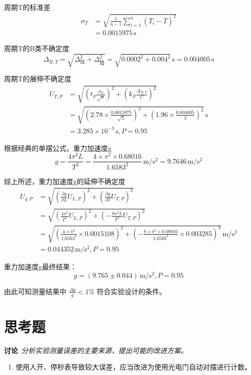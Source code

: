\documentclass[UTF8]{article}
\newcommand{\sector}[2]{\section*{#1}%
\vspace*{-0.8em}\large{#2}%
\vspace*{-0.3em}
}
\begin{document}
{周期T的标准差
$$
\begin{aligned}
\sigma_{T}&=\sqrt{\frac{1}{n-1}\sum_{i=1}^n\left(T_i-\overline{T}\right)^2}\\
&=0.0015975\,\mathrm{s}
\end{aligned}
$$

周期T的B类不确定度
$$
\Delta_{B,T}=\sqrt{\Delta_\text{仪}^2+\Delta_\text{估}^2}=\sqrt{0.0002^2+0.004^2}\,\mathrm{s}=0.004005\,\mathrm{s}
$$

周期T的展伸不确定度
$$
\begin{aligned}
U_{T,P}&=\sqrt{\left(t_P\frac{\sigma_{T}}{\sqrt{n}}\right)^2+\left(k_P\frac{\Delta_{B,T}}{C}\right)^2}\\
&=\sqrt{\left(2.78\times\frac{0.0015975}{\sqrt{5}}\right)^2+\left(1.96\times\frac{0.004005}{3}\right)^2}\,\mathrm{s}\\
&=3.285 \times 10^{-3}\,\mathrm{s},P=0.95
\end{aligned}
$$

根据经典的单摆公式，重力加速度g
$$
g=\frac{4 \pi^{2} L}{T^{2}}=\frac{4\times \pi^2\times 0.68016}{1.6583^2}\,\mathrm{m/s^2}=9.7646\,\mathrm{m/s^2}
$$

综上所述，重力加速度g的延伸不确定度
$$
\begin{aligned}
U_{g,P}&=\sqrt{\left(\frac{\partial g}{\partial L}U_{L,P}\right)^2+\left(\frac{\partial g}{\partial T}U_{T,P}\right)^2}\\
&=\sqrt{\left(\frac{4 \pi^{2}}{T^{2}}U_{L,P}\right)^2+\left(- \frac{8 \pi^{2} L}{T^{3}}U_{T,P}\right)^2}\\
&=\sqrt{\left(\frac{4\times \pi^2}{1.6583^2}\times 0.0015108\right)^2+\left(-\frac{8\times \pi^2\times 0.68016}{1.6583^3}\times 0.003285\right)^2}\,\mathrm{m/s^2}\\
&=0.044352\,\mathrm{m/s^2},P=0.95
\end{aligned}
$$

重力加速度g最终结果：
$$
g=\left(9.765 \pm 0.044\right)\,\mathrm{m/s^2} ,P=0.95
$$

由此可知测量结果中 $\frac{\Delta g}{g} < 1\%$ 符合实验设计的条件。

}\sector{思考题}{

    \textbf{讨论}\ \textsl{分析实验测量误差的主要来源，提出可能的改进方案。}

    \begin{enumerate}[itemindent=1.3em,parsep=5pt,label=\arabic*.]
        \item 使用人开、停秒表导致较大误差，应当改进为使用光电门自动对摆进行计数。
        

\end{enumerate}}
\end{document}
